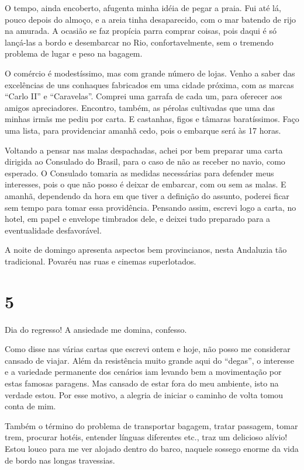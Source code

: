 O tempo, ainda encoberto, afugenta minha idéia de pegar a praia. Fui até lá, pouco depois do almoço, e a areia tinha desaparecido, com o mar batendo de rijo na amurada. A ocasião se faz propícia parra comprar coisas, pois daqui é só lançá-las a bordo e desembarcar no Rio, confortavelmente, sem o tremendo problema de lugar e peso na bagagem.

O comércio é modestíssimo, mas com grande número de lojas. Venho a saber das excelências de uns conhaques fabricados em uma cidade próxima, com as marcas ``Carlo II'' e ``Caravelas''. Comprei uma garrafa de cada um, para oferecer aos amigos apreciadores. Encontro, também, as pérolas cultivadas que uma das minhas irmãs me pediu por carta. E castanhas, figos e tâmaras baratíssimos. Faço uma lista, para providenciar amanhã cedo, pois o embarque será às 17 horas.

Voltando a pensar nas malas despachadas, achei por bem preparar uma carta dirigida ao Consulado do Brasil, para o caso de não as receber no navio, como esperado. O Consulado tomaria as medidas necessárias para defender meus interesses, pois o que não posso é deixar de embarcar, com ou sem as malas. E amanhã, dependendo da hora em que tiver a definição do assunto, poderei ficar sem tempo para tomar essa providência. Pensando assim, escrevi logo a carta, no hotel, em papel e envelope timbrados dele, e deixei tudo preparado para a eventualidade desfavorável.

A noite de domingo apresenta aspectos bem provincianos, nesta Andaluzia tão tradicional. Povaréu nas ruas e cinemas superlotados.

\section*{5 \adfflatleafright {}}
Dia do regresso! A ansiedade me domina, confesso.

Como disse nas várias cartas que escrevi ontem e hoje, não posso me considerar cansado de viajar. Além da resistência muito grande aqui do ``degas'', o interesse e a variedade permanente dos cenários iam levando bem a movimentação por estas famosas paragens. Mas cansado de estar fora do meu ambiente, isto na verdade estou. Por esse motivo, a alegria de iniciar o caminho de volta tomou conta de mim.

Também o término do problema de transportar bagagem, tratar passagem, tomar trem, procurar hotéis, entender línguas diferentes etc., traz um delicioso alívio! Estou louco para me ver alojado dentro do barco, naquele sossego enorme da vida de bordo nas longas travessias.

